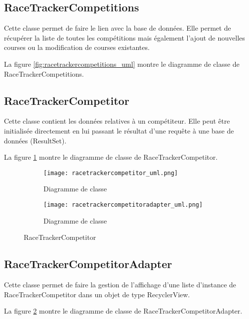 \subsection{RaceTrackerCompetitions}

Cette classe permet de faire le lien avec la base de données. Elle permet de récupérer la liste de toutes les compétitions mais également l'ajout de nouvelles courses ou la modification de courses existantes.

La figure \ref{fig:racetrackercompetitions_uml} montre le diagramme de classe de RaceTrackerCompetitions.

\subsection{RaceTrackerCompetitor}

Cette classe contient les données relatives à un compétiteur. Elle peut être initialisée directement en lui passant le résultat d'une requête à une base de données (ResultSet).

La figure \ref{fig:racetrackercompetitor_uml} montre le diagramme de classe de RaceTrackerCompetitor.

\begin{figure}[htb!]
    \centering
    \begin{subfigure}[htb]{1\textwidth}
		\texttt{[image: racetrackercompetitor\_uml.png]} 
		\caption{Diagramme de classe}
		\label{fig:racetrackercompetitor_uml}
    \end{subfigure}
    \begin{subfigure}[htb]{1\textwidth}
		\texttt{[image: racetrackercompetitoradapter\_uml.png]} 
		\caption{Diagramme de classe}
		\label{fig:racetrackercompetitoradapter_uml}
    \end{subfigure}
    \caption{RaceTrackerCompetitor}\label{fig:racetrackercompetitor_fig}
\end{figure}

\subsection{RaceTrackerCompetitorAdapter}

Cette classe permet de faire la gestion de l'affichage d'une liste d'instance de RaceTrackerCompetitor dans un objet de type RecyclerView.

La figure \ref{fig:racetrackercompetitoradapter_uml} montre le diagramme de classe de RaceTrackerCompetitorAdapter.

